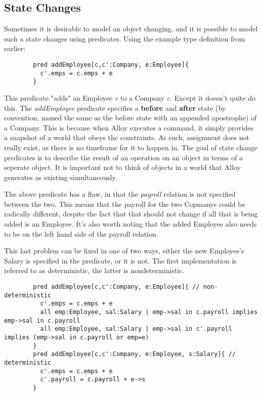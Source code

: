 \documentclass[10pt]{article}
\begin{document}
    \subsection*{State Changes}
      Sometimes it is desirable to model an object changing, and it is possible to model such a state changes using predicates. Using the example type definition from earlier:
      \begin{verbatim}
        pred addEmployee[c,c':Company, e:Employee]{
          c'.emps = c.emps + e
        }
      \end{verbatim}
      This predicate "adds" an Employee \textit{e} to a Company \textit{c}. Except it doesn't quite do this. The \textit{addEmployee} predicate specifies a \textbf{before} and \textbf{after} state (by convention, named the same as the before state with an appended apostrophe) of a Company. This is because when Alloy executes a command, it simply provides a snapshot of a world that obeys the constraints. As such, assignment does not really exist, as there is no timeframe for it to happen in. The goal of state change predicates is to describe the result of an operation on an object in terms of a seperate object. It is important not to think of objects in a world that Alloy generates as existing simultaneously.\par
      The above predicate has a flaw, in that the \textit{payroll} relation is not specified between the two. This means that the payroll for the two Copmanys could be radically different, despite the fact that that should not change if all that is being added is an Employee. It's also worth noting that the added Employee also needs to be on the left hand side of the payroll relation.\par
      This last problem can be fixed in one of two ways, either the new Employee's Salary is specified in the predicate, or it is not. The first implementation is referred to as deterministic, the latter is nondeterministic.
      \begin{verbatim}
        pred addEmployee[c,c':Company, e:Employee]{ // non-deterministic
          c'.emps = c.emps + e
          all emp:Employee, sal:Salary | emp->sal in c.payroll implies emp->sal in c.payroll
          all emp:Employee, sal:Salary | emp->sal in c'.payroll implies (emp->sal in c.payroll or emp=e)
        }
        pred addEmployee[c,c':Company, e:Employee, s:Salary]{ // deterministic
          c'.emps = c.emps + e
          c'.payroll = c.payroll + e->s
        }
      \end{verbatim}
\end{document}
